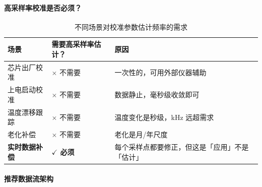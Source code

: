 \documentclass[UTF8,a4paper,11pt]{ctexart}
\begin{document}
\paragraph{高采样率校准是否必须？}

\begin{table}[ht]
\centering
\caption{不同场景对校准参数估计频率的需求}
\begin{tabular}{p{3.5cm}p{4cm}p{5cm}}
\toprule
\textbf{场景} & \textbf{需要高采样率估计？} & \textbf{原因} \\
\midrule
芯片出厂校准 & $\times$ 不需要 & 一次性的，可用外部仪器辅助 \\
上电启动校准 & $\times$ 不需要 & 数据静止，毫秒级收敛即可 \\
温度漂移跟踪 & $\times$ 不需要 & 温度变化是秒级，kHz 远超需求 \\
老化补偿 & $\times$ 不需要 & 老化是月/年尺度 \\
\textbf{实时数据补偿} & \textbf{$\checkmark$ 必须} & 每个采样点都要修正，但这是「应用」不是「估计」 \\
\bottomrule
\end{tabular}
\end{table}

\paragraph{推荐数据流架构}
\end{document}

